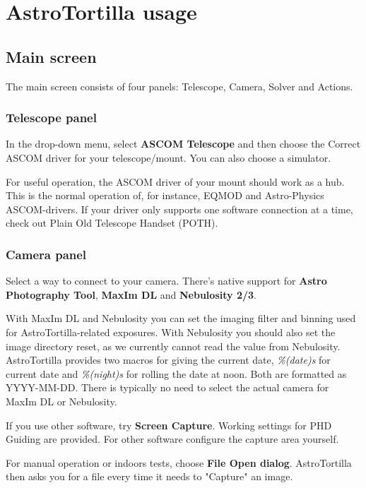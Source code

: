 \documentclass[english]{article}
\begin{document}
\newpage

\section{AstroTortilla usage}

\subsection{Main screen}

The main screen consists of four panels: Telescope, Camera, Solver and Actions.

\subsubsection{Telescope panel}

In the drop-down menu, select \textbf{ASCOM Telescope} and then choose the Correct 
ASCOM driver for your telescope/mount. You can also choose a simulator.

For useful operation, the ASCOM driver of your mount should work as a hub.
This is the normal operation of, for instance, EQMOD and Astro-Physics
ASCOM-drivers. If your driver only supports one software connection at a 
time, check out Plain Old Telescope Handset (POTH).

\subsubsection{Camera panel}

Select a way to connect to your camera. There's native support for \textbf{Astro Photography Tool}, \textbf{MaxIm DL} and \textbf{Nebulosity 2/3}. 

With MaxIm DL and Nebulosity you can set the imaging filter and binning used for AstroTortilla-related exposures. With Nebulosity you should also set the image directory reset, as we currently cannot read the value from Nebulosity. AstroTortilla provides two macros for giving the current date, \textit{\%(date)s} for current date and \textit{\%(night)s} for rolling the date at noon. Both are formatted as YYYY-MM-DD. There is typically no need to select the actual camera for MaxIm DL or Nebulosity.

If you use other software, try \textbf{Screen Capture}. Working settings for PHD Guiding are provided. For other software configure the capture area yourself.

For manual operation or indoors tests, choose \textbf{File Open dialog}. AstroTortilla then asks you for a file every time it needs to "Capture" an image.
\end{document}
